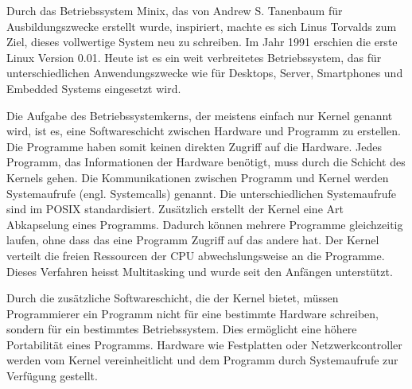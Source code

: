 Durch das Betriebssystem Minix, das von Andrew S. Tanenbaum für Ausbildungszwecke erstellt wurde, inspiriert, machte es sich Linus Torvalds zum Ziel, dieses vollwertige System neu zu schreiben. Im Jahr 1991 erschien die erste Linux Version 0.01\cite{ehses2011systemprogrammierung_chap2}. Heute ist es ein weit verbreitetes Betriebssystem, das für unterschiedlichen Anwendungszwecke wie für Desktops, Server, Smartphones und Embedded Systems eingesetzt wird.
\par
Die Aufgabe des Betriebssystemkerns, der meistens einfach nur Kernel genannt wird, ist es, eine Softwareschicht zwischen Hardware und Programm zu erstellen. Die Programme haben somit keinen direkten Zugriff auf die Hardware. Jedes Programm, das Informationen der Hardware benötigt, muss durch die Schicht des Kernels gehen. Die Kommunikationen zwischen Programm und Kernel werden Systemaufrufe (engl. Systemcalls) genannt. Die unterschiedlichen Systemaufrufe sind im POSIX standardisiert\cite{ehses2011systemprogrammierung_chap2}. Zusätzlich erstellt der Kernel eine Art Abkapselung eines Programms. Dadurch können mehrere Programme gleichzeitig laufen, ohne dass das eine Programm Zugriff auf das andere hat. Der Kernel verteilt die freien Ressourcen der CPU abwechslungsweise an die Programme. Dieses Verfahren heisst Multitasking und wurde seit den Anfängen unterstützt.
\par
Durch die zusätzliche Softwareschicht, die der Kernel bietet, müssen Programmierer ein Programm nicht für eine bestimmte Hardware schreiben, sondern für ein bestimmtes Betriebssystem. Dies ermöglicht eine höhere Portabilität eines Programms. Hardware wie Festplatten oder Netzwerkcontroller werden vom Kernel vereinheitlicht und dem Programm durch Systemaufrufe zur Verfügung gestellt.
\par

